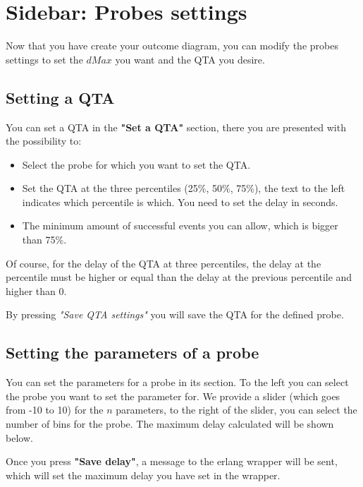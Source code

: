 \section{Sidebar: Probes settings}
    Now that you have create your outcome diagram, you can modify the probes settings to set the $dMax$ you want and the QTA you desire.

\subsection{Setting a QTA}
    You can set a QTA in the \textbf{"Set a QTA"} section, there you are presented with the possibility to:
    \begin{itemize}
        \item Select the probe for which you want to set the QTA.
        \item Set the QTA at the three percentiles (25\%, 50\%, 75\%), the text to the left indicates which percentile is which. You need to set the delay in seconds.
        \item The minimum amount of successful events you can allow, which is bigger than 75\%.
    \end{itemize}
    Of course, for the delay of the QTA at three percentiles, the delay at the percentile must be higher or equal than the delay at the previous percentile and higher than 0.
    
    By pressing \textit{"Save QTA settings"} you will save the QTA for the defined probe.

\subsection{Setting the parameters of a probe}
    You can set the parameters for a probe in its section.
    To the left you can select the probe you want to set the parameter for. 
    We provide a slider (which goes from -10 to 10) for the $n$ parameters, to the right of the slider, you can select the number of bins for the probe. The maximum delay calculated will be shown below.

    Once you press \textbf{"Save delay"}, a message to the erlang wrapper will be sent, which will set the maximum delay you have set in the wrapper.

